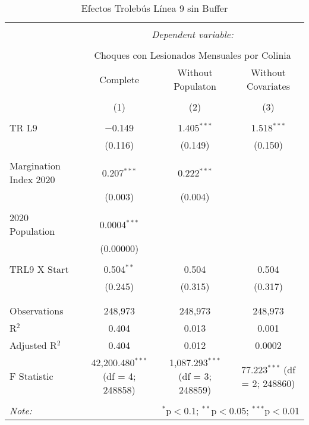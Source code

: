 
\begin{table}[!htbp] \centering 
  \caption{Efectos Trolebús Línea 9 sin Buffer} 
  \label{} 
\begin{tabular}{@{\extracolsep{5pt}}lccc} 
\\[-1.8ex]\hline 
\hline \\[-1.8ex] 
 & \multicolumn{3}{c}{\textit{Dependent variable:}} \\ 
\cline{2-4} 
\\[-1.8ex] & \multicolumn{3}{c}{Choques con Lesionados Mensuales por Colinia} \\ 
 & Complete & Without Populaton & Without Covariates \\ 
\\[-1.8ex] & (1) & (2) & (3)\\ 
\hline \\[-1.8ex] 
 TR L9 & $-$0.149 & 1.405$^{***}$ & 1.518$^{***}$ \\ 
  & (0.116) & (0.149) & (0.150) \\ 
  & & & \\ 
 Margination Index 2020 & 0.207$^{***}$ & 0.222$^{***}$ &  \\ 
  & (0.003) & (0.004) &  \\ 
  & & & \\ 
 2020 Population & 0.0004$^{***}$ &  &  \\ 
  & (0.00000) &  &  \\ 
  & & & \\ 
 TRL9 X Start & 0.504$^{**}$ & 0.504 & 0.504 \\ 
  & (0.245) & (0.315) & (0.317) \\ 
  & & & \\ 
\hline \\[-1.8ex] 
Observations & 248,973 & 248,973 & 248,973 \\ 
R$^{2}$ & 0.404 & 0.013 & 0.001 \\ 
Adjusted R$^{2}$ & 0.404 & 0.012 & 0.0002 \\ 
F Statistic & 42,200.480$^{***}$ (df = 4; 248858) & 1,087.293$^{***}$ (df = 3; 248859) & 77.223$^{***}$ (df = 2; 248860) \\ 
\hline 
\hline \\[-1.8ex] 
\textit{Note:}  & \multicolumn{3}{r}{$^{*}$p$<$0.1; $^{**}$p$<$0.05; $^{***}$p$<$0.01} \\ 
\end{tabular} 
\end{table} 
